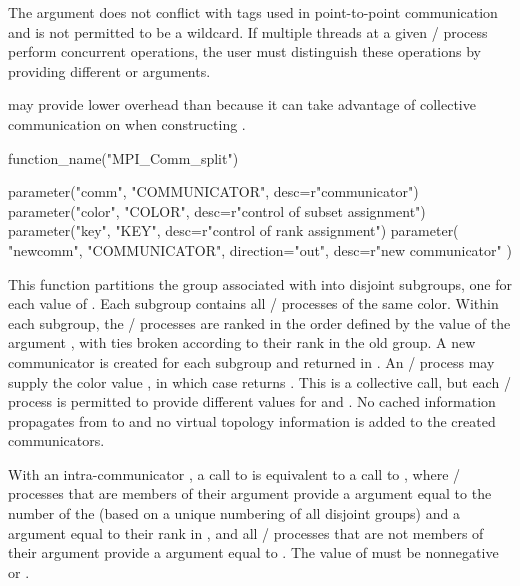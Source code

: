 The  argument does not conflict with tags used in
point-to-point communication and is not permitted to be a wildcard. If
multiple threads at a given \MPI/ process perform concurrent
 operations, the user must
distinguish these operations by providing different  or
 arguments.

\begin{users}
 may provide lower overhead than
 because it can take advantage of
collective communication on  when constructing .
\end{users}

%
\begin{mpi-binding}
    function_name("MPI_Comm_split")
    
    parameter("comm", "COMMUNICATOR", desc=r"communicator")
    parameter("color", "COLOR", desc=r"control of subset assignment")
    parameter("key", "KEY", desc=r"control of rank assignment")
    parameter(
        "newcomm", "COMMUNICATOR", direction="out", desc=r"new communicator"
    )
\end{mpi-binding}

\noindent This function partitions the group associated with 
into disjoint subgroups, one for each value of . Each subgroup
contains all \MPI/ processes of the same color. Within each subgroup, the \MPI/ processes
are ranked in the order defined by the value of the argument ,
with ties broken according to their rank in the old group. A new communicator
is created for each subgroup and returned in . An \MPI/ process may
supply the color value , in which case 
returns . This is a collective call, but each \MPI/ process
is permitted to provide different values for  and .
No cached information propagates from  to  and no
virtual topology information is added to the created communicators.

With an intra-communicator , a call to  is
equivalent to a call to , where \MPI/ processes
that are members of their  argument provide
a  argument equal to the number of the 
(based on a unique numbering of all disjoint groups) and
a  argument equal to their rank in , and
all \MPI/ processes that are not members of their  argument provide
a  argument equal to .
The value of  must be
nonnegative or .


